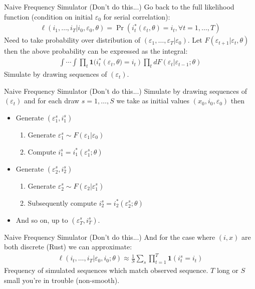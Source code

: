\begin{frame}{Naive Frequency Simulator (Don't do this...)}
Go back to the full likelihood function (condition on initial $\varepsilon_0$ for serial correlation):
\begin{align*}
\ell(i_1,\ldots,i_T | i_0, \varepsilon_0, \theta) = \Pr(i_t^{*} (\varepsilon_t,\theta) = i_t, \forall t =1,\ldots,T)
\end{align*}
Need to take probability over distribution of $(\varepsilon_1,\ldots,\varepsilon_T | \varepsilon_0)$.  Let $F(\varepsilon_{t+1} | \varepsilon_t,\theta)$ then the above probability can be expressed as the integral:
\begin{align*}
\int \cdots \int \prod_t \mathbf{1}(i_t^{*} \left(\varepsilon_t,\theta) = i_t\right) \prod_t d F(\varepsilon_t | \varepsilon_{t-1}; \theta)
\end{align*}
Simulate by drawing sequences of $(\varepsilon_t)$.
\end{frame}


\begin{frame}{Naive Frequency Simulator (Don't do this...)}
Simulate by drawing sequences of $(\varepsilon_t)$ and for each draw $s=1,\ldots,S$ we take as initial values $(x_0,i_0,\varepsilon_0)$ then
\begin{itemize}
\item Generate $(\varepsilon_1^s, i_1^s)$
	\begin{enumerate}
	\item Generate $\varepsilon_1^s \sim F(\varepsilon_1 | \varepsilon_0)$ 
	\item Compute $i_1^s = i_1^{*}(\varepsilon_1^s; \theta)$
	\end{enumerate}
\item Generate $(\varepsilon_2^s, i_2^s)$
	\begin{enumerate}
	\item Generate $\varepsilon_2^s \sim F(\varepsilon_2 | \varepsilon_1^s)$ 
	\item Subsequently compute $i_2^s = i_2^{*}(\varepsilon_2^s; \theta)$
	\end{enumerate}
\item And so on, up to $(\varepsilon_T^s,i_T^s)$.
\end{itemize}
\end{frame}


\begin{frame}{Naive Frequency Simulator (Don't do this...)}
And for the case where $(i,x)$ are both discrete (Rust) we can approximate:
\begin{align*}
\ell(i_t,\ldots,i_T | \varepsilon_0,i_0;\theta) \approx \frac{1}{S} \sum_s \prod_{t=1}^T \mathbf{1}(i_t^s = i_t)
\end{align*}
Frequency of simulated sequences which match observed sequence.  $T$ long or $S$ small you're in trouble (non-smooth).
\end{frame}



